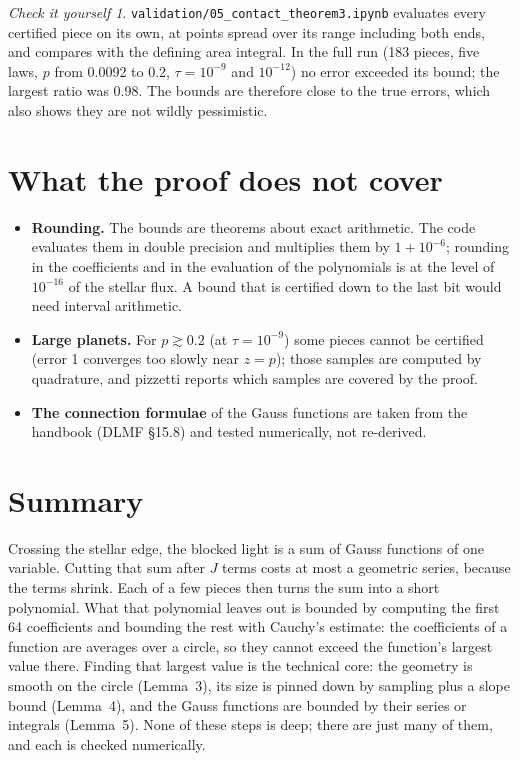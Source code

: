\documentclass[11pt,a4paper]{article}
\theoremstyle{remark}
\newtheorem*{checkit}{Check it yourself}
\newcommand{\nb}[1]{\texttt{validation/#1}}
\begin{document}
\begin{checkit}
\nb{05\_contact\_theorem3.ipynb} evaluates every certified piece on its own, at points spread over
its range including both ends, and compares with the defining area integral. In the full run
(183 pieces, five laws, $p$ from 0.0092 to 0.2, $\tau=10^{-9}$ and $10^{-12}$) no error exceeded
its bound; the largest ratio was 0.98. The bounds are therefore close to the true errors, which
also shows they are not wildly pessimistic.
\end{checkit}

\section{What the proof does not cover}

\begin{itemize}
  \item \textbf{Rounding.} The bounds are theorems about exact arithmetic. The code evaluates them
        in double precision and multiplies them by $1+10^{-6}$; rounding in the coefficients and in
        the evaluation of the polynomials is at the level of $10^{-16}$ of the stellar flux. A
        bound that is certified down to the last bit would need interval arithmetic.
  \item \textbf{Large planets.} For $p\gtrsim0.2$ (at $\tau=10^{-9}$) some pieces cannot be
        certified (error 1 converges too slowly near $z=p$); those samples are computed by
        quadrature, and pizzetti reports which samples are covered by the proof.
  \item \textbf{The connection formulae} of the Gauss functions are taken from the handbook (DLMF
        \S15.8) and tested numerically, not re-derived.
\end{itemize}

\section{Summary}

Crossing the stellar edge, the blocked light is a sum of Gauss functions of one variable. Cutting
that sum after $J$ terms costs at most a geometric series, because the terms shrink. Each of a few
pieces then turns the sum into a short polynomial. What that polynomial leaves out is bounded by
computing the first 64 coefficients and bounding the rest with Cauchy's estimate: the coefficients
of a function are averages over a circle, so they cannot exceed the function's largest value there.
Finding that largest value is the technical core: the geometry is smooth on the circle (Lemma~3),
its size is pinned down by sampling plus a slope bound (Lemma~4), and the Gauss functions are
bounded by their series or integrals (Lemma~5). None of these steps is deep; there are just many of
them, and each is checked numerically.
\end{document}
